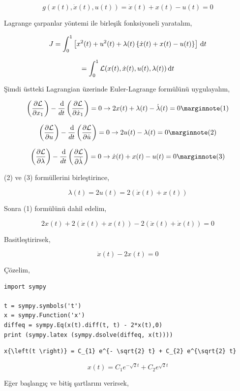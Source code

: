 \documentclass[12pt,fleqn]{article}\usepackage{../../common}
\begin{document}
$$
g( x(t), \dot{x}(t), u(t) ) =  \dot{x}(t) + x(t) - u(t)  = 0
$$

Lagrange çarpanlar yöntemi ile birleşik fonksiyoneli yaratalım,

$$
J = \int_{0}^{1} \left[ 
  x^2(t) + u^2(t) + \lambda(t) \left\{ \dot{x}(t) + x(t) - u(t)  \right\}
\right] \,\mathrm{d} t
$$

$$
=  \int_{0}^{1} \mathcal{L} (x(t), \dot{x}(t),u(t),\lambda(t)) \,\mathrm{d} t
$$

Şimdi üstteki Lagrangian üzerinde Euler-Lagrange formülünü uygulayalım, 

$$
\left( \frac{\partial \mathcal{L}}{\partial x_1} \right) -
\frac{\ud}{dt} \left( \frac{\partial \mathcal{L}}{\partial \dot{x}_1} \right) =
0 \to 2 x(t) + \lambda(t) - \dot{\lambda}(t) = 0
\mlabel{1}
$$

$$
\left( \frac{\partial \mathcal{L}}{\partial u} \right) -
\frac{\ud}{dt} \left( \frac{\partial \mathcal{L}}{\partial \dot{u}} \right) =
0 \to 2u(t) - \lambda(t) = 0
\mlabel{2}
$$

$$
\left( \frac{\partial \mathcal{L}}{\partial \lambda} \right) -
\frac{\ud}{dt} \left( \frac{\partial \mathcal{L}}{\partial \dot{\lambda}} \right) =
0 \to \dot{x}(t) + x(t) - u(t) = 0
\mlabel{3}
$$

(2) ve (3) formüllerini birleştirince,

$$
\lambda(t) = 2 u(t) = 2 (\dot{x}(t) + x(t) )
$$

Sonra (1) formülünü dahil edelim,

$$
2 x(t) + 2 (\dot{x}(t) + x(t)) - 2(\ddot{x}(t) + \dot{x}(t) ) = 0
$$

Basitleştirirsek, 

$$
\ddot{x}(t) - 2x(t) = 0
$$

Çözelim,

\begin{verbatim}
import sympy

t = sympy.symbols('t')
x = sympy.Function('x')
diffeq = sympy.Eq(x(t).diff(t, t) - 2*x(t),0)
print (sympy.latex (sympy.dsolve(diffeq, x(t))))
\end{verbatim}

\begin{verbatim}
x{\left(t \right)} = C_{1} e^{- \sqrt{2} t} + C_{2} e^{\sqrt{2} t}
\end{verbatim}

$$
x{\left(t \right)} = C_{1} e^{- \sqrt{2} t} + C_{2} e^{\sqrt{2} t}
$$

Eğer başlangıç ve bitiş şartlarını verirsek,
\end{document}
